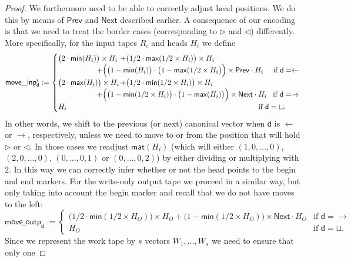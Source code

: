 \begin{proof}
    We furthermore need to be able to correctly adjust head positions. We do this by means of $\mathsf{Prev}$ and $\mathsf{Next}$
	described earlier.
    A consequence of our encoding is that we need to treat the border cases (corresponding to $\rhd$ and 
    $\lhd$) differently. More specifically, for the input tapes $R_i$ and heads $H_i$ we define 
    $$
    \mathsf{move\_inp}^i_{\mathsf{d}}:=
    \begin{cases}
    \bigl(2\cdot\mathsf{min}(H_i)\bigr)\times H_i &\!\!\!\!\!+ \bigl(1/2\cdot\mathsf{max}(1/2\times H_i)\bigr)\times H_i \\
    & \hspace{-4em}+\Bigl(\bigl(1-\mathsf{min}(H_i)\bigr)\cdot\bigl(1-\mathsf{max}(1/2 \times H_i\bigr)\Bigr)\times \mathsf{Prev}\cdot H_i \quad \text{ if $\mathsf{d}=\leftarrow$}\\
    \bigl(2\cdot \mathsf{max}(H_i)\bigr)\times H_i &\!\!\!\!\! + \bigl(1/2\cdot\mathsf{min}(1/2\times H_i)\bigr)\times H_i \\
    & \hspace{-4em}+ \Bigl(\bigl(1-\mathsf{min}(1/2\times H_i)\bigr)\cdot\bigl(1-\mathsf{max}(H_i)\bigr)\Bigr)\times \mathsf{Next}\cdot H_i  \quad\!\text{if $\mathsf{d}=\rightarrow$}\\
    H_i & \hspace{18em}\!\text{if $\mathsf{d}=\sqcup$}. 
    \end{cases}
    $$
    In other words, we shift to the previous (or next) canonical vector when $\mathsf{d}$ is $\leftarrow$ 
    or $\rightarrow$, respectively, unless we need to move to or from the position that will hold $\rhd$ 
    or $\lhd$. In those cases we readjust $\mathsf{mat}(H_i)$ (which will either $(1,0,\ldots,0)$, $(2,0,\ldots,0)$, 
    $(0,\ldots,0,1)$ or $(0,\ldots,0,2)$) by either dividing or multiplying with $2$. In this way we can 
    correctly infer whether or not the head points to the begin and end markers. For the write-only output tape we 
    proceed in a similar way, but only taking into account the begin marker and recall that we do not have 
    moves to the left:
    $$
    \mathsf{move\_outp}_{\mathsf{d}}:=
    \begin{cases}
    \bigl(1/2\cdot\mathsf{min}(1/2\times H_O)\bigr)\times H_O  + \bigl(1-\mathsf{min}(1/2\times H_O)\bigr)\times \mathsf{Next}\cdot H_O  
    & \text{if $\mathsf{d}=\rightarrow$}\\
    H_O & \text{if $\mathsf{d}=\sqcup$}. 
    \end{cases}
    $$
    Since we represent the work tape by $s$ vectors $W_1,\ldots,W_s$ we need to ensure that only one 

\end{proof}
